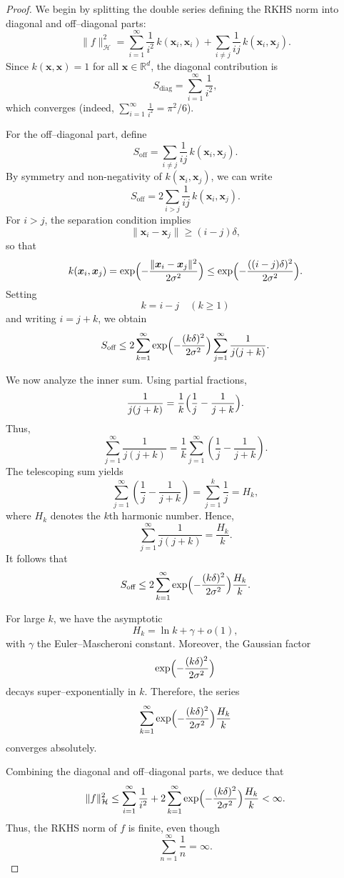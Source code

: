 \begin{proof}
We begin by splitting the double series defining the RKHS norm into diagonal and off--diagonal parts:
\[
\|f\|_{\mathcal{H}}^2 = \sum_{i=1}^\infty \frac{1}{i^2}\, k(\bm{x}_i,\bm{x}_i)
+\sum_{i\neq j} \frac{1}{ij}\, k(\bm{x}_i,\bm{x}_j).
\]
Since $k(\bm{x},\bm{x})=1$ for all $\bm{x}\in\mathbb{R}^d$, the diagonal contribution is
\[
S_{\text{diag}} = \sum_{i=1}^\infty \frac{1}{i^2},
\]
which converges (indeed, $\sum_{i=1}^\infty \frac{1}{i^2}=\pi^2/6$).

For the off--diagonal part, define
\[
S_{\text{off}} = \sum_{i\neq j} \frac{1}{ij}\, k(\bm{x}_i,\bm{x}_j).
\]
By symmetry and non-negativity of $k(\bm{x}_i,\bm{x}_j)$, we can write
\[
S_{\text{off}} = 2\sum_{i>j} \frac{1}{ij}\, k(\bm{x}_i,\bm{x}_j).
\]
For $i>j$, the separation condition implies
\[
\|\bm{x}_i-\bm{x}_j\| \ge (i-j)\delta,
\]
so that
\[
k(\bm{x}_i,\bm{x}_j) = \exp\Bigl(-\frac{\|\bm{x}_i-\bm{x}_j\|^2}{2\sigma^2}\Bigr)
\le \exp\Bigl(-\frac{((i-j)\delta)^2}{2\sigma^2}\Bigr).
\]
Setting 
\[
k = i - j \quad (k\ge 1)
\]
and writing $i=j+k$, we obtain
\[
S_{\text{off}} \le 2\sum_{k=1}^\infty \exp\Bigl(-\frac{(k\delta)^2}{2\sigma^2}\Bigr)
\sum_{j=1}^\infty \frac{1}{j(j+k)}.
\]

We now analyze the inner sum. Using partial fractions,
\[
\frac{1}{j(j+k)} = \frac{1}{k}\Bigl(\frac{1}{j} - \frac{1}{j+k}\Bigr).
\]
Thus,
\[
\sum_{j=1}^\infty \frac{1}{j(j+k)} = \frac{1}{k} \sum_{j=1}^\infty \left(\frac{1}{j} - \frac{1}{j+k}\right).
\]
The telescoping sum yields
\[
\sum_{j=1}^\infty \left(\frac{1}{j} - \frac{1}{j+k}\right)
=\sum_{j=1}^{k} \frac{1}{j} = H_k,
\]
where $H_k$ denotes the $k$th harmonic number. Hence,
\[
\sum_{j=1}^\infty \frac{1}{j(j+k)} = \frac{H_k}{k}.
\]
It follows that
\[
S_{\text{off}} \le 2\sum_{k=1}^\infty \exp\Bigl(-\frac{(k\delta)^2}{2\sigma^2}\Bigr) \frac{H_k}{k}.
\]

For large $k$, we have the asymptotic
\[
H_k = \ln k + \gamma + o(1),
\]
with $\gamma$ the Euler--Mascheroni constant. Moreover, the Gaussian factor 
\[
\exp\Bigl(-\frac{(k\delta)^2}{2\sigma^2}\Bigr)
\]
decays super--exponentially in $k$. Therefore, the series
\[
\sum_{k=1}^\infty \exp\Bigl(-\frac{(k\delta)^2}{2\sigma^2}\Bigr) \frac{H_k}{k}
\]
converges absolutely.

Combining the diagonal and off--diagonal parts, we deduce that
\[
\|f\|_{\mathcal{H}}^2 \le \sum_{i=1}^\infty \frac{1}{i^2} + 2\sum_{k=1}^\infty \exp\Bigl(-\frac{(k\delta)^2}{2\sigma^2}\Bigr) \frac{H_k}{k} < \infty.
\]
Thus, the RKHS norm of $f$ is finite, even though
\[
\sum_{n=1}^\infty \frac{1}{n} = \infty.
\]
\end{proof}